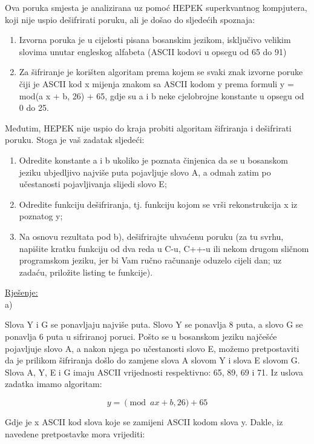 \documentclass[12pt]{article}
\begin{document}
Ova poruka smjesta je analizirana uz pomoć HEPEK superkvantnog kompjutera, koji nije uspio dešifrirati poruku, ali je došao do sljedećih spoznaja:

\begin{enumerate}
\item Izvorna poruka je u cijelosti pisana bosanskim jezikom, isključivo velikim slovima unutar engleskog alfabeta (ASCII kodovi u opsegu od 65 do 91)
\item Za šifriranje je korišten algoritam prema kojem se svaki znak izvorne poruke čiji je ASCII kod x mijenja znakom sa ASCII kodom y prema formuli y = mod(a x + b, 26) + 65, gdje su a i b neke cjelobrojne konstante u opsegu od 0 do 25.
\end{enumerate}

Međutim, HEPEK nije uspio do kraja probiti algoritam šifriranja i dešifrirati poruku. Stoga je vaš zadatak sljedeći:

\begin{enumerate}
\item Odredite konstante a i b ukoliko je poznata činjenica da se u bosanskom jeziku ubjedljivo najviše puta pojavljuje slovo A, a odmah zatim po učestanosti pojavljivanja slijedi slovo E;
\item Odredite funkciju dešifriranja, tj. funkciju kojom se vrši rekonstrukcija x iz poznatog y;
\item Na osnovu rezultata pod b), dešifrirajte uhvaćenu poruku (za tu svrhu, napišite kratku funkciju od dva reda u C-u, C++-u ili nekom drugom sličnom programskom jeziku, jer bi Vam ručno računanje oduzelo cijeli dan; uz zadaću, priložite listing te funkcije).
\end{enumerate}

\underline{Rješenje:}\\
\newpage
a)

\hspace{0.65cm}Slova Y i G se ponavljaju najviše puta. Slovo Y se ponavlja 8 puta, a slovo G se ponavlja 6 puta u sifriranoj poruci. Pošto se u bosanskom jeziku najčešće pojavljuje slovo A, a nakon njega po učestanosti slovo E, možemo pretpostaviti da je prilikom šifriranja došlo do zamjene slova A slovom Y i slova E slovom G. Slova A, Y, E i G imaju ASCII vrijednosti respektivno: 65, 89, 69 i 71. Iz uslova zadatka imamo algoritam:

$$y = \pmod{ax + b, 26} + 65$$\vspace{1mm}

Gdje je x ASCII kod slova koje se zamijeni ASCII kodom slova y. Dakle, iz navedene pretpostavke mora vrijediti:
\end{document}
